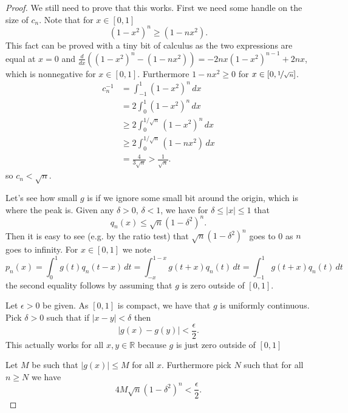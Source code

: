 \documentclass[12pt]{book}
\newcommand{\abs}[1]{\left\lvert {#1} \right\rvert}
\newcommand{\R}{{\mathbb{R}}}
\theoremstyle{plain}
\theoremstyle{remark}
\theoremstyle{definition}
\theoremstyle{exercise}
\theoremstyle{example}
\begin{document}
\begin{proof}
We still need to prove that this works.  First we need some handle on the
size of $c_n$.  Note that for $x \in [0,1]$
\begin{equation*}
{(1-x^2)}^n \geq (1-nx^2) .
\end{equation*}
This fact can be proved with a tiny bit of calculus as the two expressions are
equal at $x=0$ and 
$\frac{d}{dx}\left({(1-x^2)}^n - (1-nx^2)\right)
=-2nx{(1-x^2)}^{n-1}+2nx$, which is nonnegative for $x \in [0,1]$.
Furthermore $1-nx^2 \geq 0$ for $x \in [0,\nicefrac{1}{\sqrt{n}}]$.
\begin{equation*}
\begin{split}
c_n^{-1} & = \int_{-1}^1 {(1-x^2)}^n\,dx \\
& = 2\int_0^1 {(1-x^2)}^n\,dx \\
& \geq 2\int_0^{1/\sqrt{n}} {(1-x^2)}^n\,dx \\
& \geq 2\int_0^{1/\sqrt{n}} (1-nx^2) \,dx \\
& = \frac{4}{3\sqrt{n}}
> \frac{1}{\sqrt{n}} .
\end{split}
\end{equation*}
so $c_n < \sqrt{n}$.

Let's see how small $g$ is if we ignore some small bit around the origin,
which is where the peak is.
Given any $\delta > 0$, $\delta < 1$, we have for $\delta \leq \abs{x} \leq
1$ that
$$
q_n(x) \leq \sqrt{n}{(1-\delta^2)}^n .
$$
Then it is easy to see  (e.g. by the ratio test) that
$\sqrt{n}{(1-\delta^2)}^n$ goes to 0 as $n$ goes to infinity.
For $x \in [0,1]$ we note
$$
p_n(x) = 
\int_{0}^1 g(t)q_n(t-x) \,dt
=
\int_{-x}^{1-x} g(t+x)q_n(t) \,dt
=
\int_{-1}^{1} g(t+x)q_n(t) \,dt
$$
the second equality follows by assuming that $g$ is zero outside of
$[0,1]$.

Let $\epsilon > 0$ be given.
As $[0,1]$ is compact, we have that $g$ is uniformly continuous.
Pick $\delta > 0$ such that if $\abs{x-y} < \delta$ then
$$
\abs{g(x)-g(y)} < \frac{\epsilon}{2} .
$$
This actually works for all $x,y \in \R$ because $g$ is just zero outside
of $[0,1]$

Let $M$ be such that $\abs{g(x)} \leq M$ for all $x$.  Furthermore pick $N$
such that for all $n \geq N$
we have
$$
4M\sqrt{n}{(1-\delta^2)}^n < \frac{\epsilon}{2} .
$$


\end{proof}
\end{document}

